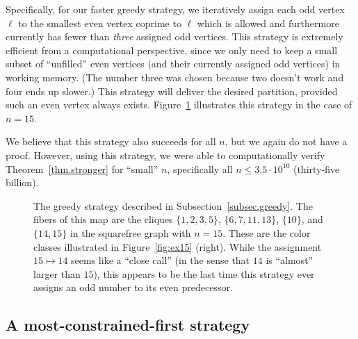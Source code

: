 \documentclass{article}
\theoremstyle{plain}
\theoremstyle{definition}
\theoremstyle{remark}
\begin{document}
Specifically, for our faster greedy strategy, we iteratively assign each odd vertex $\ell$ to the smallest even vertex coprime to $\ell$ which is allowed and furthermore currently has fewer than \emph{three} assigned odd vertices.
This strategy is extremely efficient from a computational perspective, since we only need to keep a small subset of ``unfilled'' even vertices (and their currently assigned odd vertices) in working memory.
(The number three was chosen because two doesn't work and four ends up slower.)
This strategy will deliver the desired partition, provided such an even vertex always exists.
Figure~\ref{fig:greedy} illustrates this strategy in the case of $n=15$.

We believe that this strategy also succeeds for all $n$, but we again do not have a proof.  However, using this strategy, we were able to computationally verify Theorem~\ref{thm.stronger} for ``small'' $n$, specifically all $n\leq 3.5\cdot 10^{10}$ (thirty-five billion).

\begin{figure}[t]
\centering
{}
\caption{The greedy strategy described in Subsection~\ref{subsec.greedy}.
The fibers of this map are the cliques $\{1,2,3,5\}$, $\{6,7,11,13\}$, $\{10\}$, and $\{14,15\}$ in the squarefree graph with $n=15$. These are the color classes illustrated in Figure~\ref{fig:ex15} (right).
While the assignment $15\mapsto14$ seems like a ``close call'' (in the sense that $14$ is ``almost'' larger than $15$), this appears to be the last time this strategy ever assigns an odd number to its even predecessor.}
\label{fig:greedy}
\end{figure}

\subsection{A most-constrained-first strategy}
\label{subsec.most-constrained}
\end{document}
